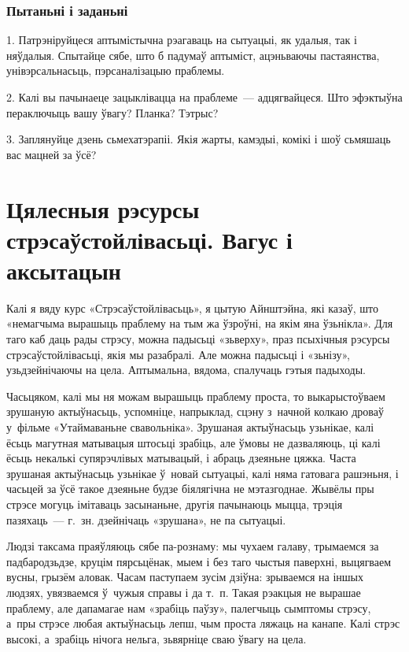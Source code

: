 \subsubsection{Пытаньні і заданьні}

1. Патрэніруйцеся аптымістычна рэагаваць на сытуацыі, як удалыя, так і няўдалыя. Спытайце сябе, што б падумаў аптыміст, ацэньваючы пастаянства, унівэрсальнасьць, пэрсаналізацыю праблемы.

2. Калі вы пачынаеце зацыклівацца на праблеме~--- адцягвайцеся. Што эфэктыўна пераключыць вашу ўвагу? Планка? Тэтрыс?

3. Заплянуйце дзень сьмехатэрапіі. Якія жарты, камэдыі, комікі і шоў сьмяшаць вас мацней за ўсё?


\section{Цялесныя рэсурсы стрэсаўстойлівасьці. Вагус і аксытацын}

Калі я вяду курс «Стрэсаўстойлівасьць», я цытую Айнштэйна, які казаў, што «немагчыма вырашыць праблему на тым жа ўзроўні, на якім яна ўзьнікла». Для таго каб даць рады стрэсу, можна падысьці «зьверху», праз псыхічныя рэсурсы стрэсаўстойлівасьці, якія мы разабралі. Але можна падысьці і «зьнізу», узьдзейнічаючы на цела. Аптымальна, вядома, спалучаць гэтыя падыходы.

Часьцяком, калі мы ня можам вырашыць праблему проста, то выкарыстоўваем зрушаную актыўнасьць, успомніце, напрыклад, сцэну з~начной колкаю дроваў у~фільме «Утаймаваньне свавольніка». Зрушаная актыўнасьць узьнікае, калі ёсьць магутная матывацыя штосьці зрабіць, але ўмовы не дазваляюць, ці калі ёсьць некалькі супярэчлівых матывацый, і абраць дзеяньне цяжка. Часта зрушаная актыўнасьць узьнікае ў~новай сытуацыі, калі няма гатовага рашэньня, і часьцей за ўсё такое дзеяньне будзе біялягічна не мэтазгоднае. Жывёлы пры стрэсе могуць імітаваць засынаньне, другія пачынаюць мыцца, трэція пазяхаць~--- г.~зн. дзейнічаць «зрушана», не па сытуацыі.

Людзі таксама праяўляюць сябе па-рознаму: мы чухаем галаву, трымаемся за падбародзьдзе, круцім пярсьцёнак, мыем і без таго чыстыя паверхні, выцягваем вусны, грызём аловак. Часам паступаем зусім дзіўна: зрываемся на іншых людзях, увязваемся ў~чужыя справы і да т.~п. Такая рэакцыя не вырашае праблему, але дапамагае нам «зрабіць паўзу», палегчыць сымптомы стрэсу, а~пры стрэсе любая актыўнасьць лепш, чым проста ляжаць на канапе. Калі стрэс высокі, а~зрабіць нічога нельга, зьвярніце сваю ўвагу на цела.

